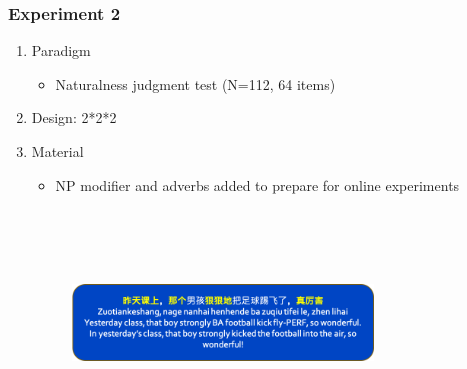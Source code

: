 \documentclass{beamer}
\begin{document}

\begin{frame}
\frametitle{Experiment 2}

\begin{enumerate}
    \item Paradigm 
    \begin{itemize}
        \item Naturalness judgment test (N=112, 64 items)
    \end{itemize}
   \item Design: 2*2*2
   \item Material 
   \begin{itemize}
       \item NP modifier and adverbs added to prepare for online experiments
   \end{itemize}
\begin{figure}
\includegraphics[width=8cm,height=6cm,keepaspectratio]{SHF_Presentation/Example.png}
\end{figure}
\end{enumerate}
\end{frame}



\end{document}
